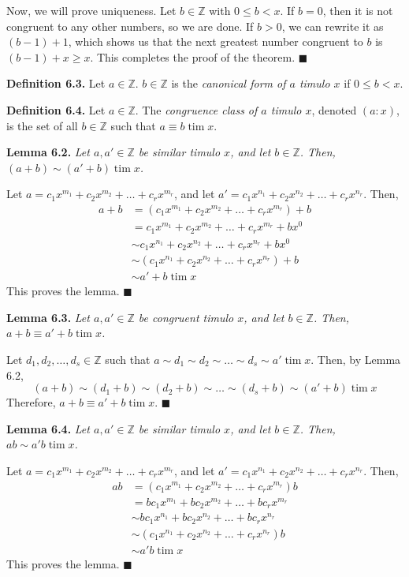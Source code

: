 \documentclass{article}
\newcommand{\tim}{\;\text{tim}\;}
\newcommand{\zee}{\mathbb{Z}}
\begin{document}
Now, we will prove uniqueness. Let $b \in \zee$
with $0 \leq b < x$. If $b = 0$, then it is not
congruent to any other numbers, so we are done.
If $b > 0$,
we can rewrite it as $(b - 1) + 1$,
which shows us that the next greatest number congruent to
$b$ is $(b - 1) + x \geq x$.
This completes the proof of the theorem.
$\blacksquare$

\textbf{Definition 6.3.} Let $a \in \zee$.
$b \in \zee$ is the \textit{canonical form of $a$ timulo $x$}
if $0 \leq b < x$.

\textbf{Definition 6.4.} Let $a \in \zee$. The
\textit{congruence class of $a$ timulo $x$},
denoted $(a:x)$, is the set of all $b \in \zee$
such that $a \equiv b \tim x$.

\textbf{Lemma 6.2.} \textit{Let $a, a' \in \zee$ be
similar timulo $x$, and let $b \in \zee$. Then,
$(a + b) \sim (a' + b) \tim x$.}

Let $a = c_1x^{m_1} + c_2x^{m_2} + \ldots + c_rx^{m_r}$,
and let
$a' = c_1x^{n_1} + c_2x^{n_2} + \ldots + c_rx^{n_r}$.
Then,
\[\begin{split}
    a + b &= (c_1x^{m_1} + c_2x^{m_2} + \ldots + c_rx^{m_r}) + b \\
    &= c_1x^{m_1} + c_2x^{m_2} + \ldots + c_rx^{m_r} + bx^0 \\
    &\sim c_1x^{n_1} + c_2x^{n_2} + \ldots + c_rx^{n_r} + bx^0 \\
    &\sim (c_1x^{n_1} + c_2x^{n_2} + \ldots + c_rx^{n_r}) + b \\
    &\sim a' + b \tim x
\end{split}\]
This proves the lemma. $\blacksquare$

\textbf{Lemma 6.3.} \textit{Let $a, a' \in \zee$ be
congruent timulo $x$, and let $b \in \zee$. Then,
$a + b \equiv a' + b \tim x$.}

Let $d_1, d_2, \ldots, d_s \in \zee$
such that $a \sim d_1 \sim d_2 \sim \ldots \sim d_s \sim a' \tim x$.
Then, by Lemma 6.2,
\[(a + b) \sim (d_1 + b) \sim (d_2 + b) \sim \ldots
\sim (d_s + b) \sim (a' + b) \tim x\]
Therefore, $a + b \equiv a' + b \tim x$.
$\blacksquare$

\textbf{Lemma 6.4.} \textit{Let $a, a' \in \zee$ be
similar timulo $x$, and let $b \in \zee$. Then,
$ab \sim a'b \tim x$.}

Let $a = c_1x^{m_1} + c_2x^{m_2} + \ldots + c_rx^{m_r}$,
and let
$a' = c_1x^{n_1} + c_2x^{n_2} + \ldots + c_rx^{n_r}$.
Then,
\[\begin{split}
    ab &= (c_1x^{m_1} + c_2x^{m_2} + \ldots + c_rx^{m_r})b \\
    &= bc_1x^{m_1} + bc_2x^{m_2} + \ldots + bc_rx^{m_r} \\
    &\sim bc_1x^{n_1} + bc_2x^{n_2} + \ldots + bc_rx^{n_r} \\
    &\sim (c_1x^{n_1} + c_2x^{n_2} + \ldots + c_rx^{n_r})b \\
    &\sim a'b \tim x
\end{split}\]
This proves the lemma. $\blacksquare$
\end{document}

